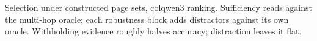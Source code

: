 \begin{table}[t]
\vspace{2pt}

\caption{\small Selection under constructed page sets, colqwen3 ranking. Sufficiency reads against the multi-hop oracle; each robustness block adds distractors against its own oracle. Withholding evidence roughly halves accuracy; distraction leaves it flat.}
\label{tab:selection}
\end{table}